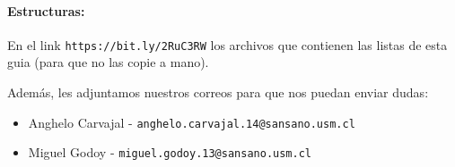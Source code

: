 \paragraph{Estructuras:} En el link \texttt{https://bit.ly/2RuC3RW} los archivos que contienen las listas de esta guia (para que no las copie a mano).

Además, les adjuntamos nuestros correos para que nos puedan enviar dudas:
\begin{itemize}
    \item Anghelo Carvajal - \texttt{anghelo.carvajal.14@sansano.usm.cl}
    \item Miguel Godoy - \texttt{miguel.godoy.13@sansano.usm.cl}

\end{itemize}

